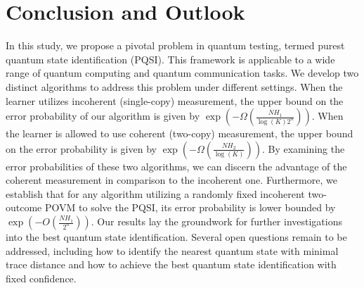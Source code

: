 \section{Conclusion and Outlook}
\label{sec: conclusion}

In this study, we propose a pivotal problem in quantum testing, termed purest quantum state identification (PQSI). This framework is applicable to a wide range of quantum computing and quantum communication tasks. We develop two distinct algorithms to address this problem under different settings. When the learner utilizes incoherent (single-copy) measurement, the upper bound on the error probability of our algorithm is given by $ \exp\left(- \Omega\left(\frac{N H_1}{\log(K) 2^n }\right) \right) $. When the learner is allowed to use coherent (two-copy) measurement, the upper bound on the error probability is given by $ \exp\left(- \Omega\left(\frac{N H_2}{\log(K) }\right) \right) $. By examining the error probabilities of these two algorithms, we can discern the advantage of the coherent measurement in comparison to the incoherent one. Furthermore, we establish that for any algorithm utilizing a randomly fixed incoherent two-outcome POVM to solve the PQSI, its error probability is lower bounded by $ \exp\left( - O\left(\frac{N H_1}{2^n}\right)\right) $. Our results lay the groundwork for further investigations into the best quantum state identification. Several open questions remain to be addressed, including how to identify the nearest quantum state with minimal trace distance and how to achieve the best quantum state identification with fixed confidence.




